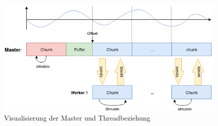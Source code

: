 \begin{figure}[H]
	\centering
	\includegraphics[width=1\textwidth]{pictures/Master_Slave_Dia2.png}
	\caption{Visualisierung der Master und Threadbeziehung}
	\label{fig:Visu_Master_Worker}
\end{figure}